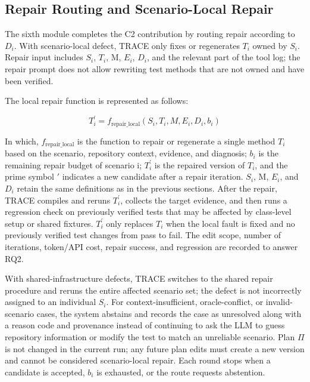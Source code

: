 \documentclass[pdflatex,sn-basic,Numbered,iicol]{sn-jnl}
\begin{document}
\subsection{Repair Routing and Scenario-Local Repair}\label{subsec:repair-routing}

The sixth module completes the C2 contribution by routing repair according to $D_i$. With scenario-local defect, TRACE only fixes or regenerates $T_i$ owned by $S_i$. Repair input includes $S_i$, $T_i$, M, $E_i$, $D_i$, and the relevant part of the tool log; the repair prompt does not allow rewriting test methods that are not owned and have been verified.

The local repair function is represented as follows:

\begin{equation}
T_i^{\prime} = f_{\mathrm{repair\_local}}(S_i,T_i,M,E_i,D_i,b_i)
\label{eq:local-repair}
\end{equation}

In which, $f_{\mathrm{repair\_local}}$ is the function to repair or regenerate a single method $T_i$ based on the scenario, repository context, evidence, and diagnosis; $b_i$ is the remaining repair budget of scenario i; $T_i^{\prime}$ is the repaired version of $T_i$, and the prime symbol \ensuremath{\prime} indicates a new candidate after a repair iteration. $S_i$, M, $E_i$, and $D_i$ retain the same definitions as in the previous sections. After the repair, TRACE compiles and reruns $T_i^{\prime}$, collects the target evidence, and then runs a regression check on previously verified tests that may be affected by class-level setup or shared fixtures. $T_i^{\prime}$ only replaces $T_i$ when the local fault is fixed and no previously verified test changes from pass to fail. The edit scope, number of iterations, token/API cost, repair success, and regression are recorded to answer RQ2.

With shared-infrastructure defects, TRACE switches to the shared repair procedure and reruns the entire affected scenario set; the defect is not incorrectly assigned to an individual $S_i$. For context-insufficient, oracle-conflict, or invalid-scenario cases, the system abstains and records the case as unresolved along with a reason code and provenance instead of continuing to ask the LLM to guess repository information or modify the test to match an unreliable scenario. Plan \ensuremath{\Pi} is not changed in the current run; any future plan edits must create a new version and cannot be considered scenario-local repair. Each round stops when a candidate is accepted, $b_i$ is exhausted, or the route requests abstention.
\end{document}
